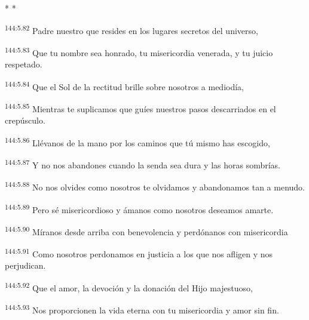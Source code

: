\begin{center}
	\par* * *
\end{center}

\begin{center}
\par
\textsuperscript{144:5.82} Padre nuestro que resides en los lugares secretos del universo,

\par
\textsuperscript{144:5.83} Que tu nombre sea honrado, tu misericordia venerada, y tu juicio respetado.

\par
\textsuperscript{144:5.84} Que el Sol de la rectitud brille sobre nosotros a mediodía,

\par
\textsuperscript{144:5.85} Mientras te suplicamos que guíes nuestros pasos descarriados en el crepúsculo.

\par
\textsuperscript{144:5.86} Llévanos de la mano por los caminos que tú mismo has escogido,

\par
\textsuperscript{144:5.87} Y no nos abandones cuando la senda sea dura y las horas sombrías.

\par
\textsuperscript{144:5.88} No nos olvides como nosotros te olvidamos y abandonamos tan a menudo.

\par
\textsuperscript{144:5.89} Pero sé misericordioso y ámanos como nosotros deseamos amarte.

\par
\textsuperscript{144:5.90} Míranos desde arriba con benevolencia y perdónanos con misericordia

\par
\textsuperscript{144:5.91} Como nosotros perdonamos en justicia a los que nos afligen y nos perjudican.

\par
\textsuperscript{144:5.92} Que el amor, la devoción y la donación del Hijo majestuoso,

\par
\textsuperscript{144:5.93} Nos proporcionen la vida eterna con tu misericordia y amor sin fin.


\end{center}
